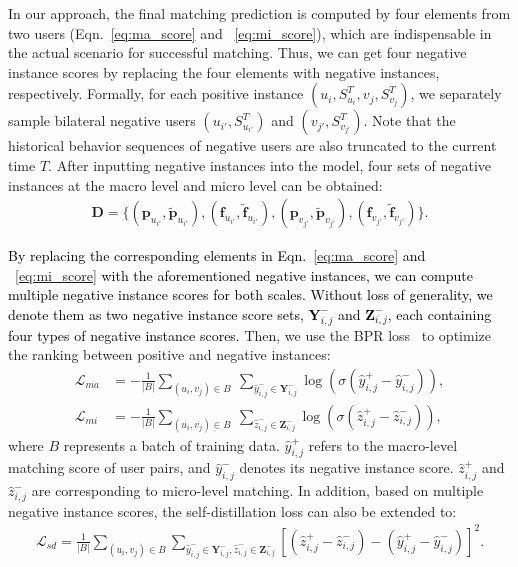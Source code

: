 In our approach, the final matching prediction is computed by four elements from two users (Eqn.~\eqref{eq:ma_score} and ~\eqref{eq:mi_score}), which are indispensable in the actual scenario for successful matching. Thus, we can get four negative instance scores by replacing the four elements with negative instances, respectively. Formally, for each positive instance $(u_i, {S}^T_{u_i}, v_j, {S}^T_{v_j})$, we separately sample bilateral negative users $(u_{i'}, {S}^T_{u_{i'}})$ and $(v_{j'}, {S}^T_{v_{j'}})$. Note that the historical behavior sequences of negative users are also truncated to the current time $T$. After inputting negative instances into the model, four sets of negative instances at the macro level and micro level can be obtained:
\begin{align}
    \bm{D} = \{(\bm{p}_{u_{i'}}, \widetilde{\bm{p}}_{u_{i'}}),(\bm{f}_{u_{i'}}, \widetilde{\bm{f}}_{u_{i'}}),(\bm{p}_{v_{j'}}, \widetilde{\bm{p}}_{v_{j'}}),(\bm{f}_{v_{j'}}, \widetilde{\bm{f}}_{v_{j'}})\}.
\end{align}

\textcolor{black}{By replacing the corresponding elements in Eqn.~\eqref{eq:ma_score} and ~\eqref{eq:mi_score} with the aforementioned negative instances, we can compute multiple negative instance scores for both scales. Without loss of generality, we denote them as two negative instance score sets, $\bm{Y}^{-}_{i,j}$ and $\bm{Z}^{-}_{i,j}$, each containing four types of negative instance scores.} 
Then, we use the BPR loss~\cite{rendle2009bpr} to optimize the ranking between positive and negative instances:
\begin{align}
    \mathcal{L}_{ma}
    & = - \frac{1}{|B|} \sum_{(u_i,v_j) \in B} \ \sum_{\hat{y}^{-}_{i,j} \in \bm{Y}^{-}_{i,j}} \log \left( \sigma ( \hat{y}^{+}_{i,j}-\hat{y}^{-}_{i,j})\right), \\
    \mathcal{L}_{mi}
    & = - \frac{1}{|B|} \sum_{(u_i,v_j) \in B} \ \sum_{\hat{z}^{-}_{i,j} \in \bm{Z}^{-}_{i,j}} \log \left( \sigma ( \hat{z}^{+}_{i,j}- \hat{z}^{-}_{i,j} )\right),
\end{align}
where $B$ represents a batch of training data. $\hat{y}^{+}_{i,j}$ refers to the macro-level matching score of user pairs, and $\hat{y}^{-}_{i,j}$ denotes its negative instance score. $\hat{z}^{+}_{i,j}$ and $\hat{z}^{-}_{i,j}$ are corresponding to micro-level matching. In addition, based on multiple negative instance scores, the self-distillation loss can also be extended to:
\begin{align}
    \mathcal{L}_{sd}
     = \frac{1}{|B|} \sum_{(u_i,v_j) \in B}  \sum_{\scriptscriptstyle{\hat{y}^{-}_{i,j} \in \bm{Y}^{-}_{i,j}, \hat{z}^{-}_{i,j} \in \bm{Z}^{-}_{i,j}}} \scriptstyle{\left[(\hat{z}^{+}_{i,j} - \hat{z}^{-}_{i,j}) - (\hat{y}^{+}_{i,j} -\hat{y}^{-}_{i,j})\right]^{2}}.
     \label{eq:lsd}
\end{align}


